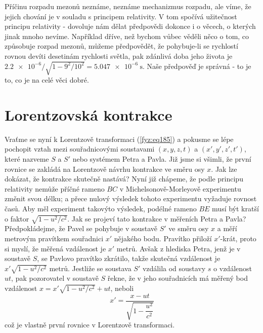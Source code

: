     Příčinu rozpadu mezonů neznáme, neznáme mechanizmus rozpadu, ale víme, že jejich chování je v 
    souladu s principem relativity. V tom spočívá užitečnost principu relativity - dovoluje nám 
    dělat předpovědi dokonce i o věcech, o kterých jinak mnoho nevíme. Například dříve, než bychom 
    vůbec věděli něco o tom, co způsobuje rozpad mezonů, můžeme předpovědět, že pohybuje-li se 
    rychlostí rovnou devíti desetinám rychlosti světla, pak zdánlivá doba jeho života
    je \(\num{2.2e-6}/\sqrt{1 - 9^2/10^2} = \SI{5.047e-6}{\s}\). Naše předpověď je správná - to je 
    to, co je na celé věci dobré.
    
  \section{Lorentzovská kontrakce}\label{fyz:IchapXVsecVII}
    Vraťme se nyní k Lorentzově transformaci (\ref{fyz:eq185}) a pokusme se lépe pochopit vztah 
    mezi souřadnicovými soustavami \((x,y, z, t)\) a \((x', y', z', t')\), které nazveme \(S\) a 
    \(S'\) nebo systémem Petra a Pavla. Již jsme si všimli, že první rovnice se zakládá na 
    Lorentzově návrhu kontrakce ve směru osy \(x\). Jak lze dokázat, že kontrakce skutečně nastává? 
    Nyní již chápeme, že podle principu relativity nemůže příčné rameno \(BC\) v 
    Michelsonově-Morleyově experimentu změnit svou délku; a přece nulový výsledek tohoto 
    experimentu vyžaduje rovnost časů. Aby měl experiment takovýto výsledek, podélné rameno \(BE\) 
    musí být kratší o faktor \(\sqrt{1 - u^2/c^2}\). Jak se projeví tato kontrakce v měřeních Petra 
    a Pavla? Předpokládejme, že Pavel se pohybuje v soustavě \(S'\) ve směru osy \(x\) a měří 
    metrovým pravítkem souřadnici \(x'\) nějakého bodu. Pravítko přiloží \(x'\)-krát, proto si 
    myslí, že měřená vzdálenost je \(x'\) metrů. Avšak z hlediska Petra, jenž je v soustavě \(S\), 
    se Pavlovo pravítko zkrátilo, takže skutečná vzdálenost je \(x'\sqrt{1 - u^2/c^2}\) metrů. 
    Jestliže se soustava \(S'\) vzdálila od soustavy \(s\) o vzdálenost \(ut\), pak pozorovatel v 
    soustavě \(S\) řekne, že v jeho souřadnicích má měřený bod vzdálenost \(x = x'\sqrt{1 - 
    u^2/c^2} + ut\), neboli
    \begin{equation*}
      x'= \frac{x-ut}{\sqrt{1 - \dfrac{u^2}{c^2}}}
    \end{equation*}
    což je vlastně první rovnice v Lorentzově transformaci.
    
